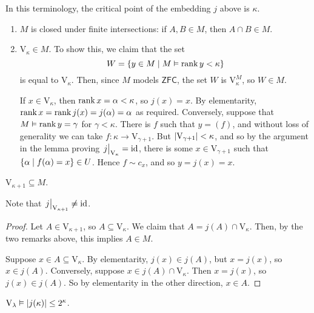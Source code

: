 In this terminology, the critical point of the embedding \( j \) above is \( \kappa \).
\begin{remark}
    \begin{enumerate}
        \item \( M \) is closed under finite intersections: if \( A, B \in M \), then \( A \cap B \in M \).
        \item \( \mathrm{V}_\kappa \in M \).
        To show this, we claim that the set
        \[ W = \qty{y \in M \mid M \vDash \rank y < \kappa} \]
        is equal to \( \mathrm{V}_\kappa \).
        Then, since \( M \) models \( \mathsf{ZFC} \), the set \( W \) is \( \mathrm{V}_\kappa^M \), so \( W \in M \).

        If \( x \in \mathrm{V}_\kappa \), then \( \rank x = \alpha < \kappa \), so \( j(x) = x \).
        By elementarity, \( \rank x = \rank j(x) = j(\alpha) = \alpha \) as required.
        Conversely, suppose that \( M \vDash \rank y = \gamma \) for \( \gamma < \kappa \).
        There is \( f \) such that \( y = (f) \), and without loss of generality we can take \( f : \kappa \to \mathrm{V}_{\gamma + 1} \).
        But \( \abs{\mathrm{V}_{\gamma + 1}} < \kappa \), and so by the argument in the lemma proving \( \eval{j}_{\mathrm{V}_\kappa} = \id \), there is some \( x \in \mathrm{V}_{\gamma + 1} \) such that \( \qty{\alpha \mid f(\alpha) = x} \in U \).
        Hence \( f \sim c_x \), and so \( y = j(x) = x \).
    \end{enumerate}
\end{remark}
\begin{lemma}
    \( \mathrm{V}_{\kappa + 1} \subseteq M \).
\end{lemma}
Note that \( \eval{j}_{\mathrm{V}_{\kappa + 1}} \neq \id \).
\begin{proof}
    Let \( A \in \mathrm{V}_{\kappa + 1} \), so \( A \subseteq \mathrm{V}_\kappa \).
    We claim that \( A = j(A) \cap \mathrm{V}_\kappa \).
    Then, by the two remarks above, this implies \( A \in M \).

    Suppose \( x \in A \subseteq \mathrm{V}_\kappa \).
    By elementarity, \( j(x) \in j(A) \), but \( x = j(x) \), so \( x \in j(A) \).
    Conversely, suppose \( x \in j(A) \cap \mathrm{V}_\kappa \).
    Then \( x = j(x) \), so \( j(x) \in j(A) \).
    So by elementarity in the other direction, \( x \in A \).
\end{proof}
\begin{lemma}
    \( \mathrm{V}_\lambda \vDash \abs{j(\kappa)} \leq 2^\kappa \).
\end{lemma}

